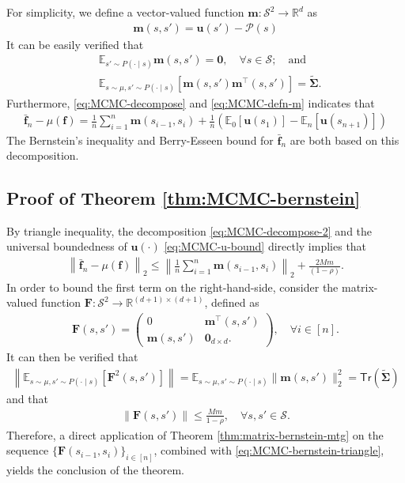 For simplicity, we define a vector-valued function $\bm{m}: \mathcal{S}^2 \to \mathbb{R}^d$ as
\begin{align}\label{eq:MCMC-defn-m}
\bm{m}(s,s') = \bm{u}(s')-\mathcal{P}(s)
\end{align}
It can be easily verified that
\begin{align}
&\mathbb{E}_{s' \sim P(\cdot \mid s)}\bm{m}(s,s') = \bm{0}, \quad \forall s \in \mathcal{S}; \quad \text{and}\\ 
&\mathbb{E}_{s \sim \mu, s' \sim P(\cdot \mid s)}[\bm{m}(s,s')\bm{m}^\top(s,s')]=\tilde{\bm{\Sigma}}.
\end{align}
Furthermore, \eqref{eq:MCMC-decompose} and \eqref{eq:MCMC-defn-m} indicates that
\begin{align}\label{eq:MCMC-decompose-2}
\bar{\bm{f}}_n - \mu(\bm{f}) = \frac{1}{n}\sum_{i=1}^n \bm{m}(s_{i-1},s_i) + \frac{1}{n} \left(\mathbb{E}_0[\bm{u}(s_1)] - \mathbb{E}_n[\bm{u}(s_{n+1})]\right)
\end{align}
The Bernstein's inequality and Berry-Esseen bound for $\bar{\bm{f}}_n$ are both based on this decomposition.

\subsection{Proof of Theorem \ref{thm:MCMC-bernstein}}
By triangle inequality, the decomposition \eqref{eq:MCMC-decompose-2} and the universal boundedness of $\bm{u}(\cdot)$ \eqref{eq:MCMC-u-bound} directly implies that
\begin{align}\label{eq:MCMC-bernstein-triangle}
\left\|\bar{\bm{f}}_n - \mu(\bm{f})\right\|_2 \leq \left\|\frac{1}{n}\sum_{i=1}^n \bm{m}(s_{i-1},s_i)\right\|_2 + \frac{2Mm}{(1-\rho)}.
\end{align}
In order to bound the first term on the right-hand-side, consider the matrix-valued function $\bm{F}: \mathcal{S}^2 \to \mathbb{R}^{(d+1) \times (d+1)}$, defined as 
\begin{align*}
\bm{F}(s,s') = \begin{pmatrix}
0 & \bm{m}^\top(s,s') \\ 
\bm{m}(s,s') & \bm{0}_{d\times d}.
\end{pmatrix}, \quad \forall i \in [n].
\end{align*}
It can then be verified that 
\begin{align*}
\left\|\mathbb{E}_{s\sim \mu, s' \sim P(\cdot \mid s)}[\bm{F}^2(s,s')] \right\|= \mathbb{E}_{s\sim \mu, s' \sim P(\cdot \mid s)}\|\bm{m}(s,s')\|_2^2 = \mathsf{Tr}(\tilde{\bm{\Sigma}})
\end{align*}
and that
\begin{align*}
\|\bm{F}(s,s')\| \leq \frac{Mm}{1-\rho}, \quad \forall s,s' \in \mathcal{S}.
\end{align*}
Therefore, a direct application of Theorem \ref{thm:matrix-bernstein-mtg} on the sequence $\{\bm{F}(s_{i-1},s_i)\}_{i \in [n]}$, combined with \eqref{eq:MCMC-bernstein-triangle}, yields the conclusion of the theorem. 
